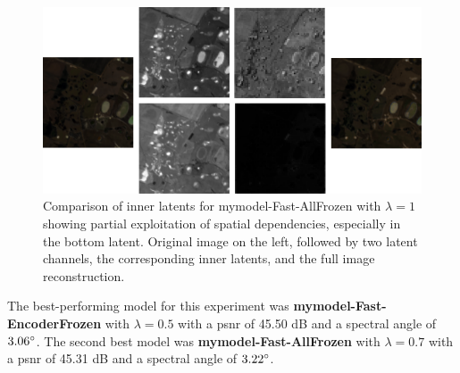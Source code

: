 \begin{figure}
\centering
\includegraphics[scale=0.85]{img/innerlatent.png}
\caption[Inner Latent Representations]{Comparison of inner latents for \ac{mymodel}-Fast-AllFrozen with $\lambda=1$ showing partial exploitation of spatial dependencies, especially in the bottom latent. Original image on the left, followed by two latent channels, the corresponding inner latents, and the full image reconstruction.}
\label{fig:innerlatent}
\end{figure}

The best-performing model for this experiment was \textbf{\ac{mymodel}-Fast-EncoderFrozen} with $\lambda=0.5$ with a \ac{psnr} of 45.50 dB and a spectral angle of $3.06 \degree$. The second best model was \textbf{\ac{mymodel}-Fast-AllFrozen} with $\lambda=0.7$ with a \ac{psnr} of 45.31 dB and a spectral angle of $3.22 \degree$.

